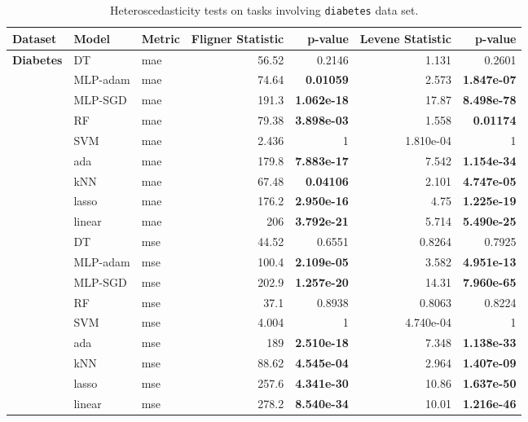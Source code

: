 \documentclass[jair,twoside,11pt,theapa]{article}
\theoremstyle{definition}
\begin{document}
\begin{table*}
\centering
\caption{Heteroscedasticity tests on tasks involving \texttt{diabetes} data set.}
\label{tab:search-spacehetero-tests-diabetes}
\begin{tabular}{lllrrrr}
\toprule
Dataset & Model & Metric & Fligner Statistic & p-value & Levene Statistic & p-value \\ 
\midrule
\textbf{Diabetes} & DT & mae & 56.52 & 0.2146 & 1.131 & 0.2601 \\ 
  & MLP-adam & mae & 74.64 & \textbf{0.01059} & 2.573 & \textbf{1.847e-07} \\ 
  & MLP-SGD & mae & 191.3 & \textbf{1.062e-18} & 17.87 & \textbf{8.498e-78} \\ 
  & RF & mae & 79.38 & \textbf{3.898e-03} & 1.558 & \textbf{0.01174} \\ 
  & SVM & mae & 2.436 & 1 & 1.810e-04 & 1 \\ 
  & ada & mae & 179.8 & \textbf{7.883e-17} & 7.542 & \textbf{1.154e-34} \\ 
  & kNN & mae & 67.48 & \textbf{0.04106} & 2.101 & \textbf{4.747e-05} \\ 
  & lasso & mae & 176.2 & \textbf{2.950e-16} & 4.75 & \textbf{1.225e-19} \\ 
  & linear & mae & 206 & \textbf{3.792e-21} & 5.714 & \textbf{5.490e-25} \\ 
  & DT & mse & 44.52 & 0.6551 & 0.8264 & 0.7925 \\ 
  & MLP-adam & mse & 100.4 & \textbf{2.109e-05} & 3.582 & \textbf{4.951e-13} \\ 
  & MLP-SGD & mse & 202.9 & \textbf{1.257e-20} & 14.31 & \textbf{7.960e-65} \\ 
  & RF & mse & 37.1 & 0.8938 & 0.8063 & 0.8224 \\ 
  & SVM & mse & 4.004 & 1 & 4.740e-04 & 1 \\ 
  & ada & mse & 189 & \textbf{2.510e-18} & 7.348 & \textbf{1.138e-33} \\ 
  & kNN & mse & 88.62 & \textbf{4.545e-04} & 2.964 & \textbf{1.407e-09} \\ 
  & lasso & mse & 257.6 & \textbf{4.341e-30} & 10.86 & \textbf{1.637e-50} \\ 
  & linear & mse & 278.2 & \textbf{8.540e-34} & 10.01 & \textbf{1.216e-46} \\ 
\bottomrule
\end{tabular}
\end{table*}
\end{document}
